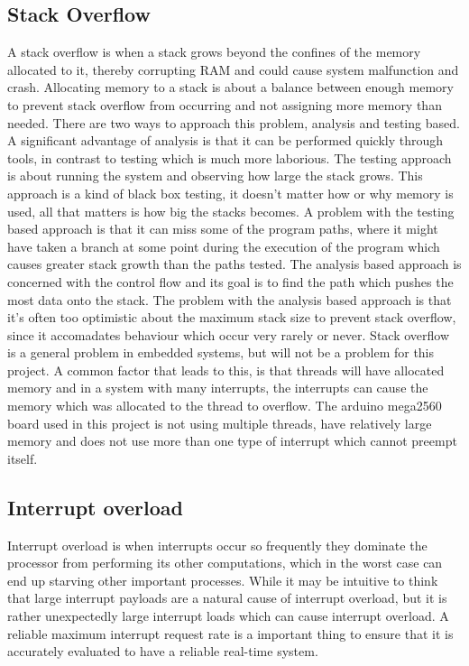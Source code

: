 \subsection{Stack Overflow}
\label{sec:Stack Overflow}
A stack overflow is when a stack grows beyond the confines of the memory allocated to it, thereby corrupting RAM and could cause system malfunction and crash. Allocating memory to a stack is about a balance between enough memory to prevent stack overflow from occurring and not assigning more memory than needed. There are two ways to approach this problem, analysis and testing based. A significant advantage of analysis is that it can be performed quickly through tools, in contrast to testing which is much more laborious. \newline 
The testing approach is about running the system and observing how large the stack grows. This approach is a kind of black box testing, it doesn’t matter how or why memory is used, all that matters is how big the stacks becomes. A problem with the testing based approach is that it can miss some of the program paths, where it might have taken a branch at some point during the execution of the program which causes greater stack growth than the paths tested. \newline
The analysis based approach is concerned with the control flow and its goal is to find the path which pushes the most data onto the stack. The problem with the analysis based approach is that it's often too optimistic about the maximum stack size to prevent stack overflow, since it accomadates behaviour which occur very rarely or never. \newline
Stack overflow is a general problem in embedded systems, but will not be a problem for this project. A common factor that leads to this, is that threads will have allocated memory and in a system with many interrupts, the interrupts can cause the memory which was allocated to the thread to overflow. The arduino mega2560 board used in this project is not using multiple threads, have relatively large memory and does not use more than one type of interrupt which cannot preempt itself. 


\subsection{Interrupt overload}
\label{sec:Interrupt overload}
Interrupt overload is when interrupts occur so frequently they dominate the processor from performing its other computations, which in the worst case can end up starving other important processes. While it may be intuitive to think that large interrupt payloads are a natural cause of interrupt overload, but it is rather unexpectedly large interrupt loads which can cause interrupt overload. A reliable maximum interrupt request rate is a important thing to ensure that it is accurately evaluated to have a reliable real-time system.


